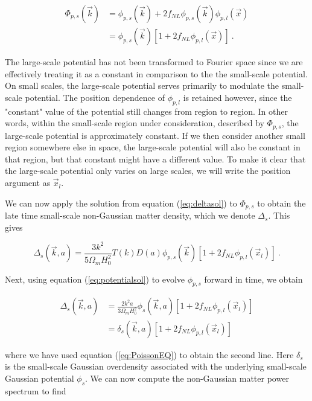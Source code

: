 \documentclass[10pt,letterpaper,final]{iopart}
\numberwithin{equation}{subsection}
\def\ni{\noindent}
\begin{document}
\begin{align}\label{eq:phiNG_small_F}
\Phi_{p,s}(\vec{k}) &= \phi_{p,s}(\vec{k}) + 2f_{NL}\phi_{p,s}(\vec{k})\phi_{p,l}(\vec{x}) \\
&= \phi_{p,s}(\vec{k})\left[ 1 + 2f_{NL}\phi_{p,l}(\vec{x})\right] \ .
\end{align}

\ni The large-scale potential has not been transformed to Fourier space since we are effectively treating it as a constant in comparison to the the small-scale potential. On small scales, the large-scale potential serves primarily to modulate the small-scale potential. The position dependence of $\phi_{p,l}$ is retained however, since the "constant" value of the potential still changes from region to region. In other words, within the small-scale region under consideration, described by $\Phi_{p,s}$, the large-scale potential is approximately constant. If we then consider another small region somewhere else in space, the large-scale potential will also be constant in that region, but that constant might have a different value. To make it clear that the large-scale potential only varies on large scales, we will write the position argument as $\vec{x}_l$.

We can now apply the solution from equation (\ref{eq:deltasol}) to $\Phi_{p,s}$ to obtain the late time small-scale non-Gaussian matter density, which we denote $\Delta_s$. This gives

\begin{equation}
\Delta_s(\vec{k}, a) = \frac{3k^2}{5\Omega_m H_0^2}T(k)D(a)\phi_{p,s}(\vec{k}) \left[1 + 2f_{NL}\phi_{p,l}(\vec{x}_l)\right] \ .
\end{equation}

\ni Next, using equation (\ref{eq:potentialsol}) to evolve $\phi_{p,s}$ forward in time, we obtain

\begin{align}
\Delta_s(\vec{k}, a) &= \frac{2k^2a}{3\Omega_m H_0^2}\phi_s(\vec{k},a)\left[1 + 2f_{NL}\phi_{p,l}(\vec{x}_l)\right] \\
&= \delta_s(\vec{k},a)\left[1 + 2f_{NL}\phi_{p,l}(\vec{x}_l)\right]
\end{align}

\ni where we have used equation (\ref{eq:PoissonEQ}) to obtain the second line. Here $\delta_s$ is the small-scale Gaussian overdensity associated with the underlying small-scale Gaussian potential $\phi_s$. We can now compute the non-Gaussian matter power spectrum to find
\end{document}
